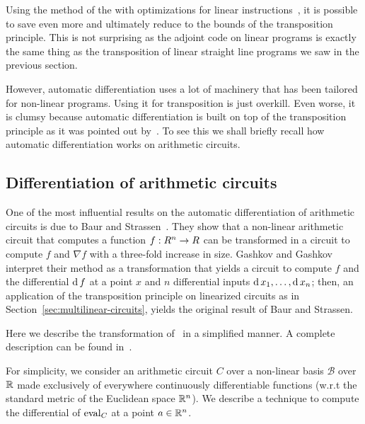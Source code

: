 Using the method of the
 with optimizations for linear
instructions~\cite{gilbert+levey+masse91}, it is possible to save even
more and ultimately reduce to the bounds of the transposition
principle. This is not surprising as the adjoint code on linear
programs is exactly the same thing as the transposition of linear
straight line programs we saw in the previous section.

However, automatic differentiation uses a lot of machinery that has
been tailored for non-linear programs. Using it for transposition is
just overkill. Even worse, it is clumsy because automatic
differentiation is built on top of the transposition principle as it
was pointed out by~\cite{gashkov+gashkov05}. To see this we shall
briefly recall how automatic differentiation works on arithmetic
circuits.

\subsection{Differentiation of arithmetic circuits}
\label{sec:diff-arithm-circ}
  One of the most
influential results on the automatic differentiation of arithmetic
circuits is due to Baur and Strassen~\cite{baur+strassen83}. They show
that a non-linear arithmetic circuit that computes a function
$f:R^n\rightarrow R$ can be transformed in a circuit to compute $f$ and
$\nabla f$ with a three-fold increase in size. Gashkov and
Gashkov~\cite{gashkov+gashkov05} interpret their method as a
transformation that yields a circuit to compute $f$ and the
differential $\operatorname{d} f$ at a point $x$ and $n$ differential inputs
$\operatorname{d} x_1,\ldots,\operatorname{d} x_n$; then, an application of the
transposition principle on linearized circuits as in
Section~\ref{sec:multilinear-circuits}, yields the original result of
Baur and Strassen.

Here we describe the transformation of~\cite{gashkov+gashkov05} in a
simplified manner. A complete description can be found
in~\cite{gashkov+gashkov05,sergeev08}.

For simplicity, we consider an arithmetic circuit $C$ over a
non-linear basis $\mathcal{B}$ over $\mathbb{R}$ made exclusively of
everywhere continuously differentiable functions (w.r.t the standard
metric of the Euclidean space $\mathbb{R}^n$). We describe a technique to
compute the differential of $\operatorname{eval}_C$ at a point $a\in\mathbb{R}^n$.

